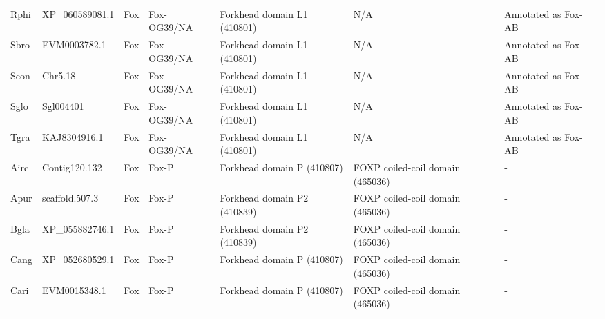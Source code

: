 \documentclass[../main.tex]{subfiles}
\begin{document}
\begin{landscape}
\begin{longtable}{lllllll}
		Rphi           & XP\_060589081.1       & Fox            & Fox-OG39/NA         & Forkhead domain L1 (410801)                 & N/A                                                                    & Annotated as Fox-AB  \\
		Sbro           & EVM0003782.1          & Fox            & Fox-OG39/NA         & Forkhead domain L1 (410801)                 & N/A                                                                    & Annotated as Fox-AB  \\
		Scon           & Chr5.18               & Fox            & Fox-OG39/NA         & Forkhead domain L1 (410801)                 & N/A                                                                    & Annotated as Fox-AB  \\
		Sglo           & Sgl004401             & Fox            & Fox-OG39/NA         & Forkhead domain L1 (410801)                 & N/A                                                                    & Annotated as Fox-AB  \\
		Tgra           & KAJ8304916.1          & Fox            & Fox-OG39/NA         & Forkhead domain L1 (410801)                 & N/A                                                                    & Annotated as Fox-AB  \\
		Airc           & Contig120.132         & Fox            & Fox-P               & Forkhead domain P (410807)                  & FOXP coiled-coil domain (465036)                                       & -                    \\
		Apur           & scaffold.507.3        & Fox            & Fox-P               & Forkhead domain P2 (410839)                 & FOXP coiled-coil domain (465036)                                       & -                    \\
		Bgla           & XP\_055882746.1       & Fox            & Fox-P               & Forkhead domain P2 (410839)                 & FOXP coiled-coil domain (465036)                                       & -                    \\
		Cang           & XP\_052680529.1       & Fox            & Fox-P               & Forkhead domain P (410807)                  & FOXP coiled-coil domain (465036)                                       & -                    \\
		Cari           & EVM0015348.1          & Fox            & Fox-P               & Forkhead domain P (410807)                  & FOXP coiled-coil domain (465036)                                       & -                    \\

\end{longtable}
\end{landscape}
\end{document}

